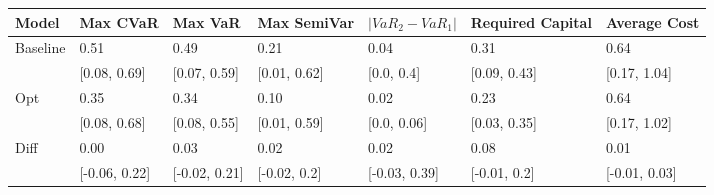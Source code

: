\begin{tabular}{lllllll}
\toprule
   Model &      Max CVaR &       Max VaR &  Max SemiVar & $|VaR_2 - VaR_1|$ & Required Capital &  Average Cost \\
\midrule
Baseline &          0.51 &          0.49 &         0.21 &              0.04 &             0.31 &          0.64 \\
         &  [0.08, 0.69] &  [0.07, 0.59] & [0.01, 0.62] &        [0.0, 0.4] &     [0.09, 0.43] &  [0.17, 1.04] \\
     Opt &          0.35 &          0.34 &         0.10 &              0.02 &             0.23 &          0.64 \\
         &  [0.08, 0.68] &  [0.08, 0.55] & [0.01, 0.59] &       [0.0, 0.06] &     [0.03, 0.35] &  [0.17, 1.02] \\
    Diff &          0.00 &          0.03 &         0.02 &              0.02 &             0.08 &          0.01 \\
         & [-0.06, 0.22] & [-0.02, 0.21] & [-0.02, 0.2] &     [-0.03, 0.39] &     [-0.01, 0.2] & [-0.01, 0.03] \\
\bottomrule
\end{tabular}
